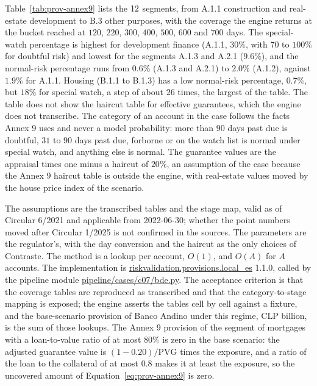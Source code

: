 Table~\ref{tab:prov-annex9} lists the $12$ segments, from A.1.1 construction and real-estate development to B.3 other purposes, with the coverage the engine returns at the bucket reached at $120$, $220$, $300$, $400$, $500$, $600$ and $700$ days. The special-watch percentage is highest for development finance (A.1.1, $30\%$, with $70$ to $100\%$ for doubtful risk) and lowest for the segments A.1.3 and A.2.1 ($9.6\%$), and the normal-risk percentage runs from $0.6\%$ (A.1.3 and A.2.1) to $2.0\%$ (A.1.2), against $1.9\%$ for A.1.1. Housing (B.1.1 to B.1.3) has a low normal-risk percentage, $0.7\%$, but $18\%$ for special watch, a step of about $26$ times, the largest of the table. The table does not show the haircut table for effective guarantees, which the engine does not transcribe. The category of an account in the case follows the facts Annex 9 uses and never a model probability: more than $90$ days past due is doubtful,
$31$ to $90$ days past due, forborne or on the watch list is normal under special watch, and anything else is normal. The guarantee values are the appraisal times one minus a haircut of $20\%$, an assumption of the case because the Annex 9 haircut table is outside the engine, with real-estate values moved by the house price index of the scenario.



The assumptions are the transcribed tables and the stage map, valid as of Circular 6/2021 and applicable from 2022-06-30; whether the point numbers moved after Circular 1/2025 is not confirmed in the sources. The parameters are the regulator's, with the day conversion and the haircut as the only choices of Contraste. The method is a lookup per account,
$O(1)$, and $O(A)$ for $A$ accounts. The implementation is \url{riskvalidation.provisions.local_es} 1.1.0, called by the pipeline module \url{pipeline/cases/c07/bde.py}. The acceptance criterion is that the coverage tables are reproduced as transcribed and that the category-to-stage mapping is exposed;
the engine asserts the tables cell by cell against a fixture, and the base-scenario provision of Banco Andino under this regime, \pvSevenBaseD{} CLP billion, is the sum of those lookups. The Annex 9 provision of the segment of mortgages with a loan-to-value ratio of at most $80\%$ is zero in the base scenario: the adjusted guarantee value is $(1-0.20)/\mathrm{PVG}$
times the exposure, and a ratio of the loan to the collateral of at most $0.8$ makes it at least the exposure, so the uncovered amount of Equation~\ref{eq:prov-annex9} is zero.

